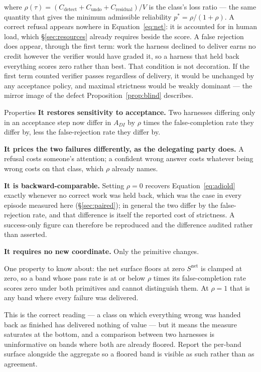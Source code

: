 where $\rho(\tau) = (C_{\text{detect}} + C_{\text{undo}} + C_{\text{residual}})/V$ is the class's loss ratio --- the same quantity that gives the minimum admissible reliability $p^{*} = \rho/(1+\rho)$. A correct refusal appears nowhere in Equation~\eqref{eq:net}: it is accounted for in human load, which \S\ref{sec:resources} already requires beside the score. A false rejection does appear, through the first term: work the harness declined to deliver earns no credit however the verifier would have graded it, so a harness that held back everything scores zero rather than best. That condition is not decoration. If the first term counted verifier passes regardless of delivery, it would be unchanged by any acceptance policy, and maximal strictness would be weakly dominant --- the mirror image of the defect Proposition~\ref{prop:blind} describes.

\begin{claimbox}{Properties}
\textbf{It restores sensitivity to acceptance.} Two harnesses differing only in an acceptance step now differ in $A_{DI}$ by $\rho$ times the false-completion rate they differ by, less the false-rejection rate they differ by.

\textbf{It prices the two failures differently, as the delegating party does.} A refusal costs someone's attention; a confident wrong answer costs whatever being wrong costs on that class, which $\rho$ already names.

\textbf{It is backward-comparable.} Setting $\rho = 0$ recovers Equation~\eqref{eq:adiold} exactly whenever no correct work was held back, which was the case in every episode measured here (\S\ref{sec:paired}); in general the two differ by the false-rejection rate, and that difference is itself the reported cost of strictness. A success-only figure can therefore be reproduced and the difference audited rather than asserted.

\textbf{It requires no new coordinate.} Only the primitive changes.
\end{claimbox}

\begin{cautionbox}{One property to know about: the net surface floors at zero}
$S^{\text{net}}$ is clamped at zero, so a band whose pass rate is at or below
$\rho$ times its false-completion rate scores zero under both primitives and
cannot distinguish them. At $\rho = 1$ that is any band where every failure was
delivered.

This is the correct reading --- a class on which everything wrong was handed
back as finished has delivered nothing of value --- but it means the measure
saturates at the bottom, and a comparison between two harnesses is uninformative
on bands where both are already floored. Report the per-band surface alongside
the aggregate so a floored band is visible as such rather than as agreement.
\end{cautionbox}

